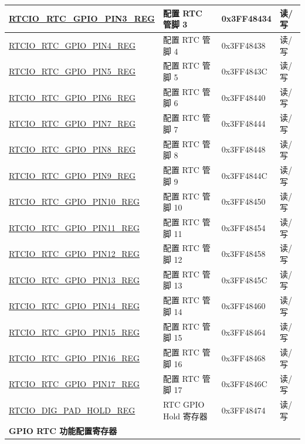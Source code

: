 \begin{longtable}{ | p{6.7cm} | p{6.5cm} | p{1.9cm} | p{0.9cm} | }
\hyperref[regdesc:RTCIORTCGPIOPINnREG]{RTCIO\_RTC\_GPIO\_PIN3\_REG} & 配置 RTC 管脚 3 & 0x3FF48434 & 读/写 \\ \hline
\hyperref[regdesc:RTCIORTCGPIOPINnREG]{RTCIO\_RTC\_GPIO\_PIN4\_REG} & 配置 RTC 管脚 4 & 0x3FF48438 & 读/写 \\ \hline
\hyperref[regdesc:RTCIORTCGPIOPINnREG]{RTCIO\_RTC\_GPIO\_PIN5\_REG} & 配置 RTC 管脚 5 & 0x3FF4843C & 读/写 \\ \hline
\hyperref[regdesc:RTCIORTCGPIOPINnREG]{RTCIO\_RTC\_GPIO\_PIN6\_REG} & 配置 RTC 管脚 6 & 0x3FF48440 & 读/写 \\ \hline
\hyperref[regdesc:RTCIORTCGPIOPINnREG]{RTCIO\_RTC\_GPIO\_PIN7\_REG} & 配置 RTC 管脚 7 & 0x3FF48444 & 读/写 \\ \hline
\hyperref[regdesc:RTCIORTCGPIOPINnREG]{RTCIO\_RTC\_GPIO\_PIN8\_REG} & 配置 RTC 管脚 8 & 0x3FF48448 & 读/写\\ \hline
\hyperref[regdesc:RTCIORTCGPIOPINnREG]{RTCIO\_RTC\_GPIO\_PIN9\_REG} & 配置 RTC 管脚 9 & 0x3FF4844C & 读/写 \\ \hline
\hyperref[regdesc:RTCIORTCGPIOPINnREG]{RTCIO\_RTC\_GPIO\_PIN10\_REG} & 配置 RTC 管脚 10 & 0x3FF48450 & 读/写 \\ \hline
\hyperref[regdesc:RTCIORTCGPIOPINnREG]{RTCIO\_RTC\_GPIO\_PIN11\_REG} & 配置 RTC 管脚 11 & 0x3FF48454 & 读/写 \\ \hline
\hyperref[regdesc:RTCIORTCGPIOPINnREG]{RTCIO\_RTC\_GPIO\_PIN12\_REG} & 配置 RTC 管脚 12 & 0x3FF48458 & 读/写 \\ \hline
\hyperref[regdesc:RTCIORTCGPIOPINnREG]{RTCIO\_RTC\_GPIO\_PIN13\_REG} & 配置 RTC 管脚 13 & 0x3FF4845C & 读/写 \\ \hline
\hyperref[regdesc:RTCIORTCGPIOPINnREG]{RTCIO\_RTC\_GPIO\_PIN14\_REG} & 配置 RTC 管脚 14 & 0x3FF48460 & 读/写 \\ \hline
\hyperref[regdesc:RTCIORTCGPIOPINnREG]{RTCIO\_RTC\_GPIO\_PIN15\_REG} & 配置 RTC 管脚 15 & 0x3FF48464 & 读/写 \\ \hline
\hyperref[regdesc:RTCIORTCGPIOPINnREG]{RTCIO\_RTC\_GPIO\_PIN16\_REG} & 配置 RTC 管脚 16 & 0x3FF48468 & 读/写\\ \hline
\hyperref[regdesc:RTCIORTCGPIOPINnREG]{RTCIO\_RTC\_GPIO\_PIN17\_REG} & 配置 RTC 管脚 17 & 0x3FF4846C & 读/写 \\ \hline
\hyperref[regdesc:RTCIODIGPADHOLDREG]{RTCIO\_DIG\_PAD\_HOLD\_REG} & RTC GPIO Hold 寄存器 & 0x3FF48474 & 读/写 \\ \hline
\multicolumn{4}{|l|}{\textbf{GPIO RTC 功能配置寄存器}} \\ \hline

\end{longtable}
